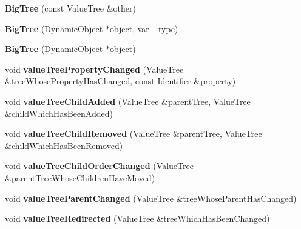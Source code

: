 \begin{DoxyCompactItemize}
\item 
\hypertarget{class_big_tree_a673a227c948d0a7fef8adacebdd6295b}{{\bfseries Big\-Tree} (const Value\-Tree \&other)}\label{class_big_tree_a673a227c948d0a7fef8adacebdd6295b}

\item 
\hypertarget{class_big_tree_acd2251e281a39ccefb6056450384abab}{{\bfseries Big\-Tree} (Dynamic\-Object $\ast$object, var \-\_\-type)}\label{class_big_tree_acd2251e281a39ccefb6056450384abab}

\item 
\hypertarget{class_big_tree_a4084e1b33ee27cddda808349c85aa351}{{\bfseries Big\-Tree} (Dynamic\-Object $\ast$object)}\label{class_big_tree_a4084e1b33ee27cddda808349c85aa351}

\item 
\hypertarget{class_big_tree_a6e08df0b0f2f20f1feedd3bad154c4c4}{void {\bfseries value\-Tree\-Property\-Changed} (Value\-Tree \&tree\-Whose\-Property\-Has\-Changed, const Identifier \&property)}\label{class_big_tree_a6e08df0b0f2f20f1feedd3bad154c4c4}

\item 
\hypertarget{class_big_tree_acc87d5d7c4737291733c5b8d2e5b02d4}{void {\bfseries value\-Tree\-Child\-Added} (Value\-Tree \&parent\-Tree, Value\-Tree \&child\-Which\-Has\-Been\-Added)}\label{class_big_tree_acc87d5d7c4737291733c5b8d2e5b02d4}

\item 
\hypertarget{class_big_tree_ae82fe163ef2366682c39fb54e42d952a}{void {\bfseries value\-Tree\-Child\-Removed} (Value\-Tree \&parent\-Tree, Value\-Tree \&child\-Which\-Has\-Been\-Removed)}\label{class_big_tree_ae82fe163ef2366682c39fb54e42d952a}

\item 
\hypertarget{class_big_tree_a062315a1f47244573a8c68555fa61e26}{void {\bfseries value\-Tree\-Child\-Order\-Changed} (Value\-Tree \&parent\-Tree\-Whose\-Children\-Have\-Moved)}\label{class_big_tree_a062315a1f47244573a8c68555fa61e26}

\item 
\hypertarget{class_big_tree_a80330adcc8f2a0f1f64a1eec8c73a2f3}{void {\bfseries value\-Tree\-Parent\-Changed} (Value\-Tree \&tree\-Whose\-Parent\-Has\-Changed)}\label{class_big_tree_a80330adcc8f2a0f1f64a1eec8c73a2f3}

\item 
\hypertarget{class_big_tree_ad51b3c047e9d1106943193818825a288}{void {\bfseries value\-Tree\-Redirected} (Value\-Tree \&tree\-Which\-Has\-Been\-Changed)}\label{class_big_tree_ad51b3c047e9d1106943193818825a288}


\end{DoxyCompactItemize}

